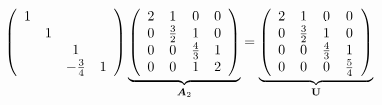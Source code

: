 \begin{frame}
\begin{small}
\begin{jie}
  $$
  \left(
    \begin{array}{cccc}
      1 & && \\
        &1&&\\
        &&1&\\
        &&-\frac34&1
    \end{array}
  \right)\underbrace{\left(
        \begin{array}{cccc}
        2 & 1 & 0 & 0\\
        0 & \frac32 & 1 & 0\\
        0 & 0 & \frac43 & 1\\
        0 & 0 & 1 & 2
        \end{array}
        \right)}_{\boldsymbol{A}_2} = \underbrace{\left(
    \begin{array}{cccc}
      2 & 1 & 0 & 0\\
      0 & \frac32 & 1 & 0\\
      0 & 0 & \frac43 & 1\\
      0 & 0 & 0  & \frac54
    \end{array}
  \right)}_{\mathbf{U}}
  $$ 
  
\end{jie}
\end{small}
\end{frame}



